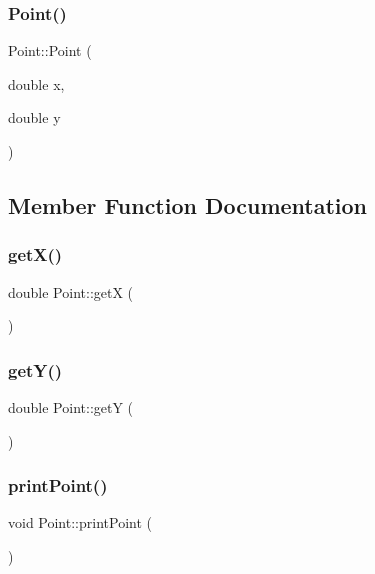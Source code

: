 \mbox{\label{classPoint_a78b55e8d5466bb8c2cf60fa55f2562ff}} 
\subsubsection{\texorpdfstring{Point()}{Point()}\hspace{0.1cm}{\footnotesize\ttfamily [2/2]}}
{\footnotesize\ttfamily Point\+::\+Point (\begin{DoxyParamCaption}\item[{double}]{x,  }\item[{double}]{y }\end{DoxyParamCaption})}



\subsection{Member Function Documentation}
\mbox{\label{classPoint_a8de35a6098cdd7267b4167776da83da6}} 
\subsubsection{\texorpdfstring{get\+X()}{getX()}}
{\footnotesize\ttfamily double Point\+::getX (\begin{DoxyParamCaption}{ }\end{DoxyParamCaption})}

\mbox{\label{classPoint_aa278c8bcb8aeb4101023a4baf473b547}} 
\subsubsection{\texorpdfstring{get\+Y()}{getY()}}
{\footnotesize\ttfamily double Point\+::getY (\begin{DoxyParamCaption}{ }\end{DoxyParamCaption})}

\mbox{\label{classPoint_ad32f6a515be1cf069bf5ea6b89178ae9}} 
\subsubsection{\texorpdfstring{print\+Point()}{printPoint()}}
{\footnotesize\ttfamily void Point\+::print\+Point (\begin{DoxyParamCaption}{ }\end{DoxyParamCaption})}

